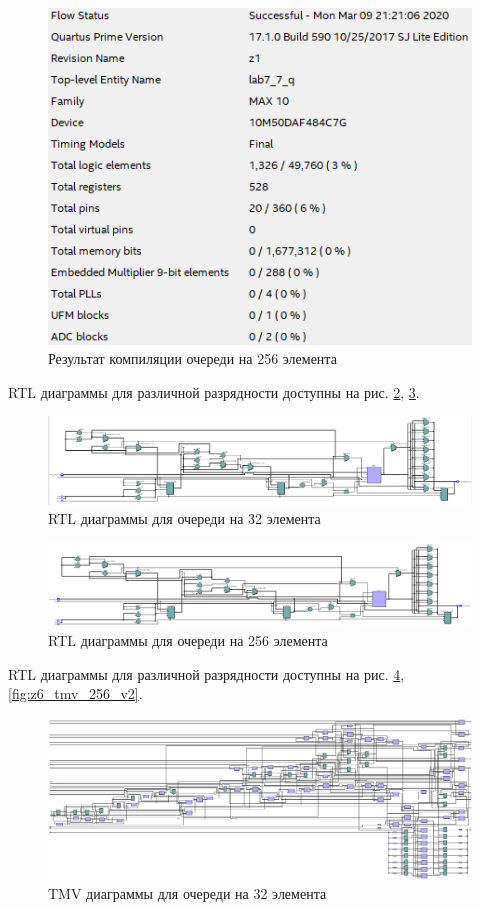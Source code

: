 \documentclass[a4paper,14pt]{article}
\begin{document}
		\begin{figure}[H]
			\centering
			\includegraphics[width=0.8\linewidth]{images/z6_res_256_v2}
			\caption{Результат компиляции очереди на 256 элемента}
			\label{fig:z6_res_256_v2}
		\end{figure}
		
		RTL диаграммы для различной разрядности доступны на рис. \ref{fig:z6_rtl_32_v2}, \ref{fig:z6_rtl_256_v2}.
		
		\begin{figure}[H]
			\centering
			\includegraphics[width=0.8\linewidth]{images/z6_rtl_32_v2}
			\caption{RTL диаграммы для очереди на 32 элемента}
			\label{fig:z6_rtl_32_v2}
		\end{figure}
		
		\begin{figure}[H]
			\centering
			\includegraphics[width=0.5\linewidth]{images/z6_rtl_256_v2}
			\caption{RTL диаграммы для очереди на 256 элемента}
			\label{fig:z6_rtl_256_v2}
		\end{figure}
		
		RTL диаграммы для различной разрядности доступны на рис. \ref{fig:z6_tmv_32_v2}, \ref{fig:z6_tmv_256_v2}.
		
		\begin{figure}[H]
			\centering
			\includegraphics[width=0.8\linewidth]{images/z6_tmv_32_v2}
			\caption{TMV диаграммы для очереди на 32 элемента}
			\label{fig:z6_tmv_32_v2}
		\end{figure}
		
\end{document}
